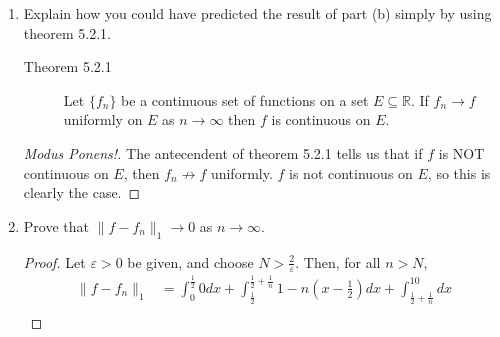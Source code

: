 \documentclass{article}
\begin{document}
\begin{enumerate}
\begin{enumerate}
\begin{proof}
\begin{align*}
                                    \lVert f-f_n\rVert_\infty & = \lVert 1-n(x_o-\frac{1}{2})\rVert_\infty                      \\
                                                              & = \lVert 1-n(\frac{1}{2n}+\frac{1}{2}-\frac{1}{2})\rVert_\infty \\
                                                              & = \lVert 1-n(\frac{1}{2n})\rVert_\infty                         \\
                                                              & = \lVert 1-\frac{1}{2}\rVert_\infty                             \\
                                                              & = \frac{1}{2}
                              \end{align*}
                        \end{proof}
                  \item Explain how you could have predicted the result of part
                        (b) simply by using theorem 5.2.1.
                        \begin{description}
                              \item[Theorem 5.2.1] Let $\{f_n\}$ be a continuous
                                    set of functions on a set $E\subseteq\mathbb{R}$.
                                    If $f_n\to f$ uniformly on $E$ as $n\to\infty$ then
                                    $f$ is continuous on $E$.
                        \end{description}
                        \begin{proof}[Modus Ponens!]
                              The antecendent of theorem 5.2.1 tells us that if $f$ is NOT
                              continuous on $E$, then $f_n\nrightarrow f$ uniformly.
                              $f$ is not continuous on $E$, so this is clearly the case.
                        \end{proof}
                  \item Prove that $\lVert f-f_n\rVert_1\to 0$ as $n\to \infty$.
                        \begin{proof}
                              Let $\varepsilon>0$ be given, and choose $N>\frac{2}{\varepsilon}$.
                              Then, for all $n>N$,
                              \begin{align*}
                                    \lVert f-f_n\rVert_1 & = \int_0^\frac{1}{2}0dx+\int_\frac{1}{2}^{\frac{1}{2}+\frac{1}{n}}1-n(x-\frac{1}{2})dx+\int_{\frac{1}{2}+\frac{1}{n}}^10dx                                          \\

\end{align*}
\end{proof}
\end{enumerate}
\end{enumerate}
\end{document}

